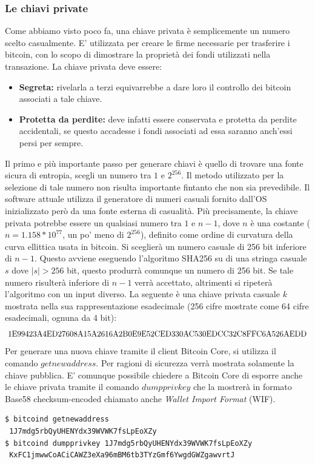 \subsubsection{Le chiavi private}
Come abbiamo visto poco fa, una chiave privata è semplicemente un numero scelto casualmente. E' utilizzata per creare le firme necessarie per trasferire i bitcoin, con lo scopo di dimostrare la proprietà dei fondi utilizzati nella transazione. La chiave privata deve essere:
\begin{itemize}
	\item \textbf{Segreta:} rivelarla a terzi equivarrebbe a dare loro il controllo dei bitcoin associati a tale chiave.
	\item \textbf{Protetta da perdite:} deve infatti essere conservata e protetta da perdite accidentali, se questo accadesse i fondi associati ad essa saranno anch'essi persi per sempre.
\end{itemize}
Il primo e più importante passo per generare chiavi è quello di trovare una fonte sicura di entropia, scegli un numero tra $1$ e $2^{256}$. Il metodo utilizzato per la selezione di tale numero non risulta importante fintanto che non sia prevedibile. Il software attuale utilizza il generatore di numeri casuali fornito dall'OS inizializzato però da una fonte esterna di casualità. Più precisamente, la chiave privata potrebbe essere un qualsiasi numero tra $1$ e $n-1$, dove $n$ è una costante ($n=1.158*10^{77}$, un po' meno di $2^{256}$), definito come ordine di curvatura della curva ellittica usata in bitcoin. Si sceglierà un numero casuale di 256 bit inferiore di $n-1$. Questo avviene eseguendo l'algoritmo SHA256 su di una stringa casuale $s$ dove $|s|>256$ bit, questo produrrà comunque un numero di 256 bit. Se tale numero risulterà inferiore di $n-1$ verrà accettato, altrimenti si ripeterà l'algoritmo con un input diverso. La seguente è una chiave privata casuale $k$ mostrata nella sua rappresentazione esadecimale (256 cifre mostrate come 64 cifre esadecimali, ognuna da 4 bit):
\[\text{\small 1E99423A4ED27608A15A2616A2B0E9E52CED330AC530EDCC32C8FFC6A526AEDD}\]
Per generare una nuova chiave tramite il client Bitcoin Core, si utilizza il comando $getnewaddress$. Per ragioni di sicurezza verrà mostrata solamente la chiave pubblica. E' comunque possibile chiedere a Bitcoin Core di esporre anche le chiave privata tramite il comando $dumpprivkey$ che la mostrerà in formato Base58 checksum-encoded chiamato anche \textit{Wallet Import Format} (WIF).
\begin{lstlisting}
$ bitcoind getnewaddress
 1J7mdg5rbQyUHENYdx39WVWK7fsLpEoXZy
$ bitcoind dumpprivkey 1J7mdg5rbQyUHENYdx39WVWK7fsLpEoXZy
 KxFC1jmwwCoACiCAWZ3eXa96mBM6tb3TYzGmf6YwgdGWZgawvrtJ
\end{lstlisting}


